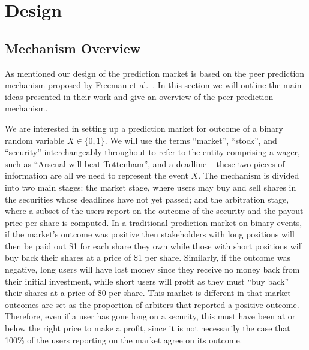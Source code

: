 \section{Design}


\label{sec:design}

\subsection{Mechanism Overview}

As mentioned our design of the prediction market is based on the peer
prediction mechanism proposed by Freeman et al.~\cite{Freeman2017}. In this
section we will outline the main ideas presented in their work and give an
overview of the peer prediction mechanism.

We are interested in setting up a prediction market for outcome of a binary
random variable $X \in \{0,1\}$. We will use the terms ``market'', ``stock'',
and ``security'' interchangeably throughout to refer to the entity comprising a
wager, such as ``Arsenal will beat Tottenham'', and a deadline -- these two
pieces of information are all we need to represent the event $X$. The mechanism
is divided into two main stages: the market stage, where users may buy and sell
shares in the securities whose deadlines have not yet passed; and the
arbitration stage, where a subset of the users report on the outcome of the
security and the payout price per share is computed. In a traditional
prediction market on binary events, if the market's outcome was positive then
stakeholders with long positions will then be paid out \$1 for each share they
own while those with short positions will buy back their shares at a price of
\$1 per share. Similarly, if the outcome was negative, long users will have
lost money since they receive no money back from their initial investment,
while short users will profit as they must ``buy back'' their shares at a price
of \$0 per share. This market is different in that market outcomes are set as
the proportion of arbiters that reported a positive outcome. Therefore, even if a
user has gone long on a security, this must have been at or below the right
price to make a profit, since it is not necessarily the case that 100\% of the
users reporting on the market agree on its outcome.

